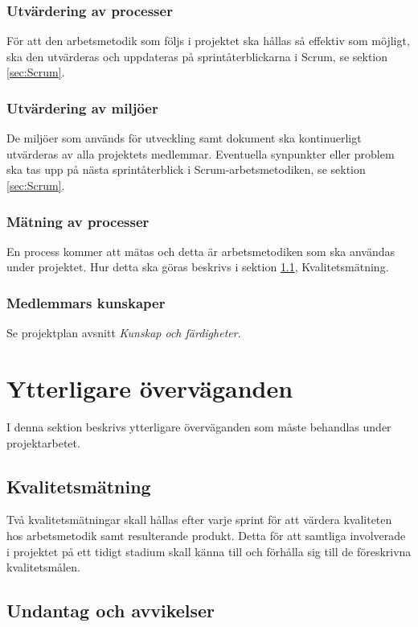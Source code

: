 \documentclass[a4paper,10pt]{article}
\begin{document}
\subsubsection{Utvärdering av processer}
För att den arbetsmetodik som följs i projektet ska hållas så effektiv som möjligt, ska den utvärderas och uppdateras på sprintåterblickarna i Scrum, se sektion \ref{sec:Scrum}.

\subsubsection{Utvärdering av miljöer}
De miljöer som används för utveckling samt dokument ska kontinuerligt utvärderas av alla projektets medlemmar. Eventuella synpunkter eller problem ska tas upp på nästa sprintåterblick i Scrum-arbetsmetodiken, se sektion \ref{sec:Scrum}.

\subsubsection{Mätning av processer}
En process kommer att mätas och detta är arbetsmetodiken som ska användas under projektet. Hur detta ska göras beskrivs i sektion \ref{sec:Kvalitetsmatning}, Kvalitetsmätning.

\subsubsection{Medlemmars kunskaper}
Se projektplan avsnitt \emph{Kunskap och färdigheter}.

\section{Ytterligare överväganden}
I denna sektion beskrivs ytterligare överväganden som måste behandlas under projektarbetet.
\subsection{Kvalitetsmätning}
\label{sec:Kvalitetsmatning}
Två kvalitetsmätningar skall hållas efter varje sprint för att värdera kvaliteten hos arbetsmetodik samt resulterande produkt.
Detta för att samtliga involverade i projektet på ett tidigt stadium skall känna till och förhålla sig till de föreskrivna kvalitetsmålen.

\subsection{Undantag och avvikelser}
\end{document}

